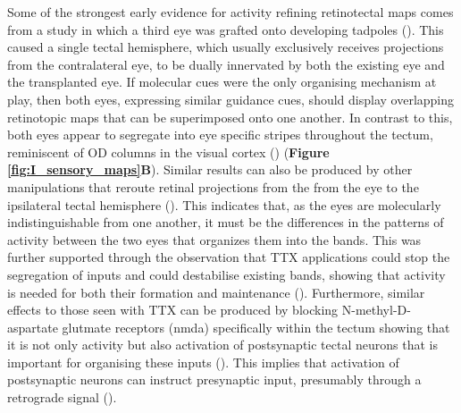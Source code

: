 Some of the strongest early evidence for activity refining retinotectal maps comes from a study in which a third eye was grafted onto developing tadpoles (\cite{Constantine-Paton1978Eye-specificFrogs}). This caused a single tectal hemisphere, which usually exclusively receives projections from the contralateral eye, to be dually innervated by both the existing eye and the transplanted eye. If molecular cues were the only organising mechanism at play, then both eyes, expressing similar guidance cues, should display overlapping retinotopic maps that can be superimposed onto one another. In contrast to this, both eyes appear to segregate into eye specific stripes throughout the tectum, reminiscent of OD columns in the visual cortex (\cite{Law1981AnatomyTecta}) (\textbf{Figure \ref{fig:I_sensory_maps}B}). Similar results can also be produced by other manipulations that reroute retinal projections from the from the eye to the ipsilateral tectal hemisphere (\cite{Straznicky1979AnomalousAblation, Law1980RightAblations}). This indicates that, as the eyes are molecularly indistinguishable from one another, it must be the differences in the patterns of activity between the two eyes that organizes them into the bands. This was further supported through the observation that TTX applications could stop the segregation of inputs and could destabilise existing bands, showing that activity is needed for both their formation and maintenance (\cite{Meyer1982TetrodotoxinGoldfish, Boss1984ActivityGoldfish}). Furthermore, similar effects to those seen with TTX can be produced by blocking N-methyl-D-aspartate glutmate receptors (\acrshort{nmda}) specifically within the tectum showing that it is not only activity but also activation of postsynaptic tectal neurons that is important for organising these inputs (\cite{Reh1985Eye-specificPipiens.}). This implies that activation of postsynaptic neurons can instruct presynaptic input, presumably through a retrograde signal (\cite{Ruthazer2004InsightsPerspective}).

